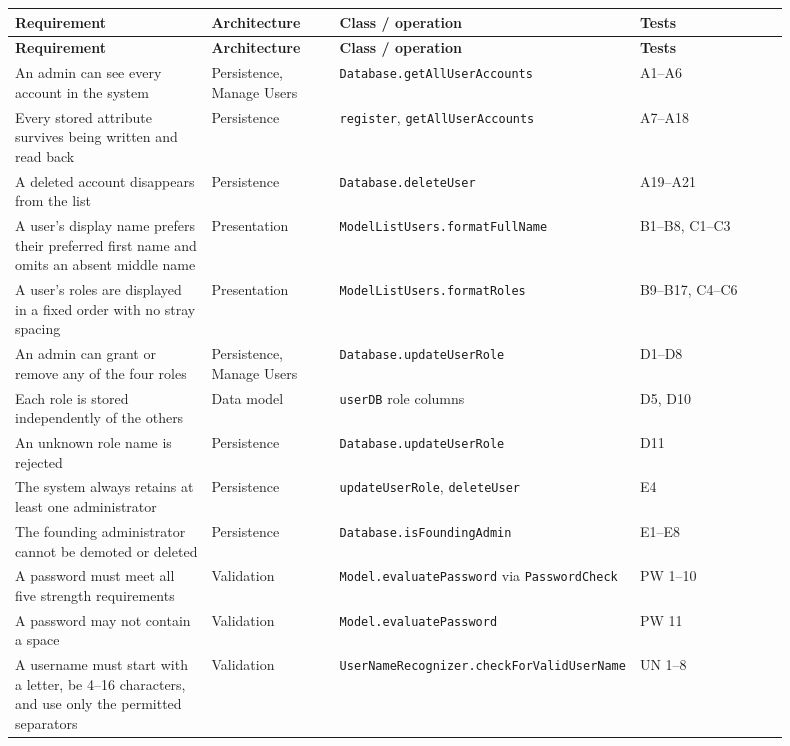 \documentclass[11pt,a4paper]{article}
\newcommand{\cls}[1]{\texttt{#1}}
\begin{document}
\begin{center}
\footnotesize
\begin{longtable}{@{}p{0.27\linewidth}p{0.17\linewidth}p{0.25\linewidth}p{0.21\linewidth}@{}}
\toprule
\textbf{Requirement} & \textbf{Architecture} & \textbf{Class / operation} &
\textbf{Tests} \\
\midrule
\endfirsthead
\toprule
\textbf{Requirement} & \textbf{Architecture} & \textbf{Class / operation} &
\textbf{Tests} \\
\midrule
\endhead
An admin can see every account in the system &
Persistence, Manage Users &
\cls{Database.getAllUserAccounts} &
A1--A6 \\
\addlinespace
Every stored attribute survives being written and read back &
Persistence &
\cls{register}, \cls{getAllUserAccounts} &
A7--A18 \\
\addlinespace
A deleted account disappears from the list &
Persistence &
\cls{Database.deleteUser} &
A19--A21 \\
\addlinespace
A user's display name prefers their preferred first name and omits an absent middle name &
Presentation &
\cls{ModelListUsers.formatFullName} &
B1--B8, C1--C3 \\
\addlinespace
A user's roles are displayed in a fixed order with no stray spacing &
Presentation &
\cls{ModelListUsers.formatRoles} &
B9--B17, C4--C6 \\
\addlinespace
An admin can grant or remove any of the four roles &
Persistence, Manage Users &
\cls{Database.updateUserRole} &
D1--D8 \\
\addlinespace
Each role is stored independently of the others &
Data model &
\cls{userDB} role columns &
D5, D10 \\
\addlinespace
An unknown role name is rejected &
Persistence &
\cls{Database.updateUserRole} &
D11 \\
\addlinespace
The system always retains at least one administrator &
Persistence &
\cls{updateUserRole}, \cls{deleteUser} &
E4 \\
\addlinespace
The founding administrator cannot be demoted or deleted &
Persistence &
\cls{Database.isFoundingAdmin} &
E1--E8 \\
\addlinespace
A password must meet all five strength requirements &
Validation &
\cls{Model.evaluatePassword} via \cls{PasswordCheck} &
PW 1--10 \\
\addlinespace
A password may not contain a space &
Validation &
\cls{Model.evaluatePassword} &
PW 11 \\
\addlinespace
A username must start with a letter, be 4--16 characters, and use only the permitted
separators &
Validation &
\cls{UserNameRecognizer.checkForValidUserName} &
UN 1--8 \\
\bottomrule
\end{longtable}
\end{center}
\end{document}

